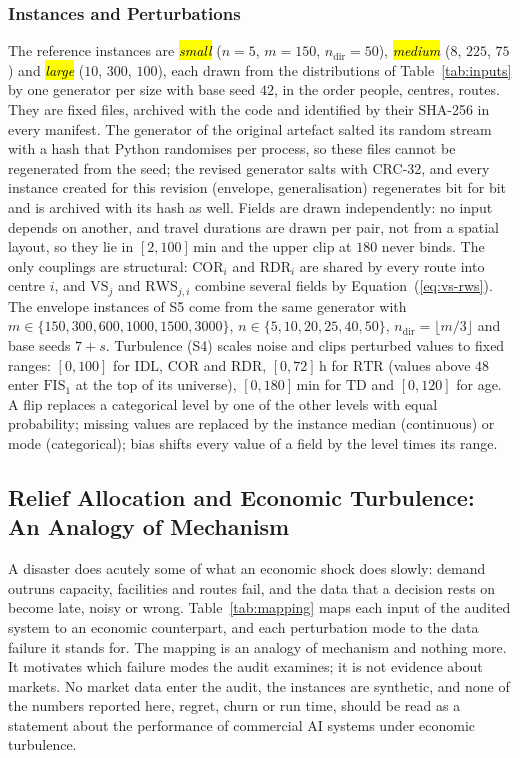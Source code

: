 \documentclass[systems,article,accept,moreauthors,pdftex]{Definitions/mdpi}
\begin{document}
\subsubsection{Instances and Perturbations}
The reference instances are \emph{\hl{small}%
} ($n=5$, $m=150$, $n_{\mathrm{dir}}=50$),
\emph{\hl{medium}%
} ($8$, $225$, $75$) and \emph{\hl{large}%
} ($10$, $300$, $100$), each drawn from the
distributions of Table~\ref{tab:inputs} by one generator per size with base seed $42$, in the
order people, centres, routes. They are fixed files, archived with the code and identified by
their SHA-256 in every manifest.
The generator of the original artefact salted its random stream with a hash that Python
randomises per process, so these files cannot be regenerated from the seed; the revised
generator salts with CRC-32, and every instance created for this revision (envelope,
generalisation) regenerates bit for bit and is archived with its hash as well.
Fields are drawn independently: no input
depends on another, and travel durations are drawn per pair, not from a spatial layout, so
they lie in $[2,100]$\,min and the upper clip at $180$ never binds. The only couplings are
structural: $\mathrm{COR}_i$ and $\mathrm{RDR}_i$ are shared by every route into centre $i$,
and $\mathrm{VS}_j$ and $\mathrm{RWS}_{j,i}$ combine several fields by
Equation~(\ref{eq:vs-rws}). The envelope instances of S5 come from the same generator with
$m\in\{150,300,600,1000,1500,3000\}$, $n\in\{5,10,20,25,40,50\}$,
$n_{\mathrm{dir}}=\lfloor m/3\rfloor$ and base seeds $7+s$. Turbulence (S4) scales noise
and clips perturbed values to fixed ranges: $[0,100]$ for $\mathrm{IDL}$, $\mathrm{COR}$ and
$\mathrm{RDR}$, $[0,72]$\,h for $\mathrm{RTR}$ (values above $48$ enter $\mathrm{FIS}_1$ at the
top of its universe), $[0,180]$\,min for $\mathrm{TD}$ and $[0,120]$ for age. A flip replaces
a categorical level by one of the other levels with equal probability; missing values are
replaced by the instance median (continuous) or mode (categorical); bias shifts every value of a
field by the level times \linebreak  its range.

\subsection{Relief Allocation and Economic Turbulence: An Analogy of Mechanism}
A disaster does acutely some of what an economic shock does slowly: demand outruns capacity,
facilities and routes fail, and the data that a decision rests on become late, noisy or wrong.
Table~\ref{tab:mapping} maps each input of the audited system to an economic counterpart, and
each perturbation mode to the data failure it stands for. The mapping is an analogy of
mechanism and nothing more. It motivates which failure modes the audit examines; it is not
evidence about markets. No market data enter the audit, the instances are synthetic, and none
of the numbers reported here, regret, churn or run time, should be read as a statement about the
performance of commercial AI systems under economic turbulence.
\end{document}
